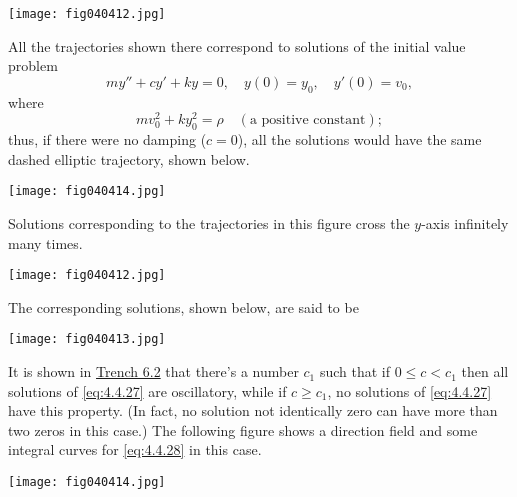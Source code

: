 \documentclass{ximera}
\begin{document}
\begin{image}
 \texttt{[image: fig040412.jpg]}
\end{image}
 
 
All the trajectories shown there correspond to
solutions of the initial value problem
$$
my''+cy'+ky=0,\quad y(0)=y_0,\quad y'(0)=v_0,
$$
where
$$
mv_0^2+ky_0^2=\rho\quad (\mbox{a positive constant});
$$
thus, if there were no damping ($c=0$),  all the solutions would
have the same dashed elliptic trajectory, shown below.
 
\begin{image}
 \texttt{[image: fig040414.jpg]}
\end{image}
 
Solutions corresponding to the trajectories in
this figure cross the $y$-axis infinitely many times.
 
\begin{image}
 \texttt{[image: fig040412.jpg]}
\end{image}
 
 
The corresponding solutions, shown below, are said to be 
 
\begin{image}
 \texttt{[image: fig040413.jpg]}
\end{image}
 
 
It is shown in \href{https://ximera.osu.edu/ode/main/springProblemsII/springProblemsII}{Trench 6.2} that there's a number $c_1$ such that if $0\leq
c<c_1$ then  all solutions of \eqref{eq:4.4.27} are oscillatory, while if
$c\geq c_1$,  no solutions of \eqref{eq:4.4.27} have this property. (In
fact, no solution not identically zero can have more than two zeros in
this case.) The following figure shows a direction field and
some integral curves for \eqref{eq:4.4.28} in this case.
 
\begin{image}
 \texttt{[image: fig040414.jpg]}
\end{image}
 
\end{document}
